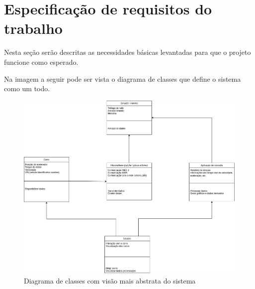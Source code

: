 \chapter{Especificação de requisitos do trabalho}

\label{CAP4}



Nesta seção serão descritas as necessidades básicas levantadas para que o projeto funcione como esperado.

Na imagem a seguir pode ser vista o diagrama de classes que define o sistema como um todo.

\begin{figure}[hp]
    \centering
    
    \includegraphics[scale=0.4]{figures/coleta_dados_carro}
    
    \caption{Diagrama de classes com visão mais abstrata do sistema}
\end{figure}

